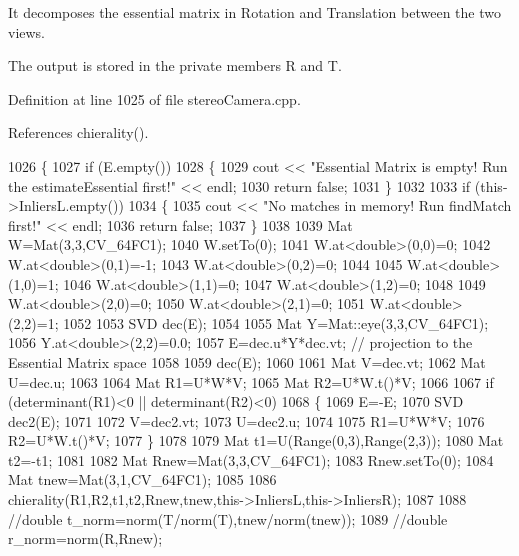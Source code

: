 It decomposes the essential matrix in Rotation and Translation between the two views. 

The output is stored in the private members R and T. 

Definition at line 1025 of file stereo\+Camera.\+cpp.



References chierality().


\begin{DoxyCode}
1026 \{
1027     \textcolor{keywordflow}{if} (E.empty())
1028     \{
1029         cout << \textcolor{stringliteral}{"Essential Matrix is empty! Run the estimateEssential first!"} << endl;
1030         \textcolor{keywordflow}{return} \textcolor{keyword}{false};
1031     \}
1032 
1033     \textcolor{keywordflow}{if} (this->InliersL.empty())
1034     \{
1035         cout << \textcolor{stringliteral}{"No matches in memory! Run findMatch first!"} << endl;
1036         \textcolor{keywordflow}{return} \textcolor{keyword}{false};
1037     \}
1038 
1039     Mat W=Mat(3,3,CV\_64FC1);
1040     W.setTo(0);
1041     W.at<\textcolor{keywordtype}{double}>(0,0)=0;
1042     W.at<\textcolor{keywordtype}{double}>(0,1)=-1;
1043     W.at<\textcolor{keywordtype}{double}>(0,2)=0;
1044 
1045     W.at<\textcolor{keywordtype}{double}>(1,0)=1;
1046     W.at<\textcolor{keywordtype}{double}>(1,1)=0;
1047     W.at<\textcolor{keywordtype}{double}>(1,2)=0;
1048 
1049     W.at<\textcolor{keywordtype}{double}>(2,0)=0;
1050     W.at<\textcolor{keywordtype}{double}>(2,1)=0;
1051     W.at<\textcolor{keywordtype}{double}>(2,2)=1;
1052 
1053     SVD dec(E);
1054 
1055     Mat Y=Mat::eye(3,3,CV\_64FC1);
1056     Y.at<\textcolor{keywordtype}{double}>(2,2)=0.0;
1057     E=dec.u*Y*dec.vt; \textcolor{comment}{// projection to the Essential Matrix space}
1058 
1059     dec(E);
1060 
1061     Mat V=dec.vt;
1062     Mat U=dec.u;
1063 
1064     Mat R1=U*W*V;
1065     Mat R2=U*W.t()*V;
1066 
1067     \textcolor{keywordflow}{if} (determinant(R1)<0 || determinant(R2)<0)
1068     \{
1069         E=-E;
1070         SVD dec2(E);
1071 
1072         V=dec2.vt;
1073         U=dec2.u;
1074 
1075         R1=U*W*V;
1076         R2=U*W.t()*V;
1077     \}
1078 
1079     Mat t1=U(Range(0,3),Range(2,3));
1080     Mat t2=-t1;
1081 
1082     Mat Rnew=Mat(3,3,CV\_64FC1);
1083     Rnew.setTo(0);
1084     Mat tnew=Mat(3,1,CV\_64FC1);
1085 
1086     chierality(R1,R2,t1,t2,Rnew,tnew,this->InliersL,this->InliersR);
1087 
1088     \textcolor{comment}{//double t\_norm=norm(T/norm(T),tnew/norm(tnew));}
1089     \textcolor{comment}{//double r\_norm=norm(R,Rnew);}

\end{DoxyCode}
